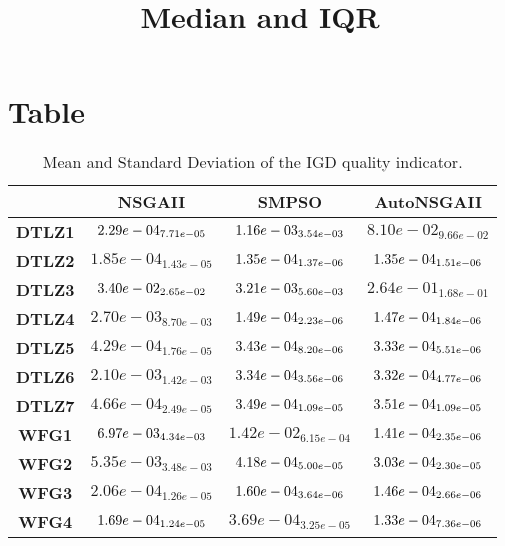 \documentclass{article}
\title{Median and IQR}
\author{}
\begin{document}
\maketitle
\section{Table}
\begin{table}[!htp]
  \caption{Mean and Standard Deviation of the IGD quality indicator.}
  \label{table:IGD}
  \centering
  \begin{scriptsize}
  \begin{tabular}{c|ccc}
      & \textbf{NSGAII} & \textbf{SMPSO} & \textbf{AutoNSGAII} \\\hline
      \textbf{DTLZ1} & $\cellcolor{gray95} 2.29e-04_{7.71e-05} $ & $ \cellcolor{gray25} 1.16e-03_{3.54e-03} $ & $ 8.10e-02_{9.66e-02}$ \\
      \textbf{DTLZ2} & $1.85e-04_{1.43e-05} $ & $ \cellcolor{gray25} 1.35e-04_{1.37e-06} $ & $ \cellcolor{gray95} 1.35e-04_{1.51e-06}$ \\
      \textbf{DTLZ3} & $\cellcolor{gray25} 3.40e-02_{2.65e-02} $ & $ \cellcolor{gray95} 3.21e-03_{5.60e-03} $ & $ 2.64e-01_{1.68e-01}$ \\
      \textbf{DTLZ4} & $2.70e-03_{8.70e-03} $ & $ \cellcolor{gray25} 1.49e-04_{2.23e-06} $ & $ \cellcolor{gray95} 1.47e-04_{1.84e-06}$ \\
      \textbf{DTLZ5} & $4.29e-04_{1.76e-05} $ & $ \cellcolor{gray25} 3.43e-04_{8.20e-06} $ & $ \cellcolor{gray95} 3.33e-04_{5.51e-06}$ \\
      \textbf{DTLZ6} & $2.10e-03_{1.42e-03} $ & $ \cellcolor{gray25} 3.34e-04_{3.56e-06} $ & $ \cellcolor{gray95} 3.32e-04_{4.77e-06}$ \\
      \textbf{DTLZ7} & $4.66e-04_{2.49e-05} $ & $ \cellcolor{gray95} 3.49e-04_{1.09e-05} $ & $ \cellcolor{gray25} 3.51e-04_{1.09e-05}$ \\
      \textbf{WFG1} & $\cellcolor{gray25} 6.97e-03_{4.34e-03} $ & $ 1.42e-02_{6.15e-04} $ & $ \cellcolor{gray95} 1.41e-04_{2.35e-06}$ \\
      \textbf{WFG2} & $5.35e-03_{3.48e-03} $ & $ \cellcolor{gray25} 4.18e-04_{5.00e-05} $ & $ \cellcolor{gray95} 3.03e-04_{2.30e-05}$ \\
      \textbf{WFG3} & $2.06e-04_{1.26e-05} $ & $ \cellcolor{gray25} 1.60e-04_{3.64e-06} $ & $ \cellcolor{gray95} 1.46e-04_{2.66e-06}$ \\
      \textbf{WFG4} & $\cellcolor{gray25} 1.69e-04_{1.24e-05} $ & $ 3.69e-04_{3.25e-05} $ & $ \cellcolor{gray95} 1.33e-04_{7.36e-06}$ \\

\end{tabular}
\end{scriptsize}
\end{table}
\end{document}
